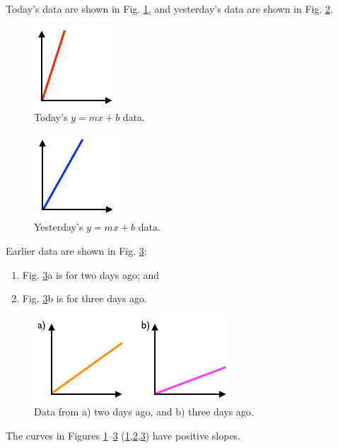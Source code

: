 Today's data are shown in Fig. \ref{fig:today}, and yesterday's data are
shown in Fig. \ref{fig:yesterday}.

\begin{figure}[htbp]
\centering
\includegraphics{img/today.png}
\caption{Today's \(y=mx+b\) data.\label{fig:today}}
\end{figure}

\begin{figure}[htbp]
\centering
\includegraphics{img/yesterday.png}
\caption{Yesterday's \(y=mx+b\) data.\label{fig:yesterday}}
\end{figure}

Earlier data are shown in Fig. \ref{fig:earlier}:

\begin{enumerate}
\def\labelenumi{\arabic{enumi}.}
\tightlist
\item
  Fig. \ref{fig:earlier}a is for two days ago; and
\item
  Fig. \ref{fig:earlier}b is for three days ago.
\end{enumerate}

\begin{figure}[htbp]
\centering
\includegraphics{img/earlier.png}
\caption{Data from a) two days ago, and b) three days
ago.\label{fig:earlier}}
\end{figure}

The curves in Figures \ref{fig:today}--\ref{fig:earlier}
(\ref{fig:today},\ref{fig:yesterday},\ref{fig:earlier}) have positive
slopes.

